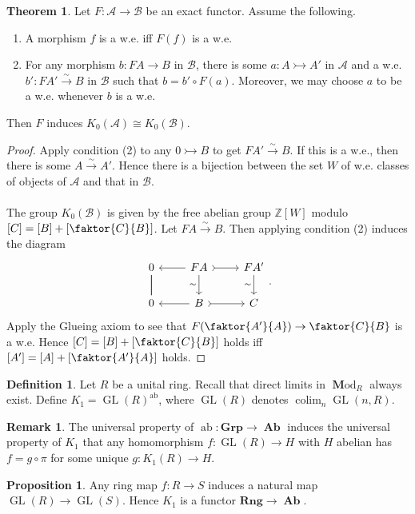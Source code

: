\documentclass[10pt,letterpaper,cm]{nupset}
\theoremstyle{definition}
\newtheorem*{definition}{Definition}
\newtheorem{remark}{Remark}
\newtheorem{theorem}{Theorem}
\newtheorem{prop}{Proposition}
\newcommand{\Z}{\mathbb Z}
\newcommand{\1}{\mathbf{1}}
\renewcommand{\a}{\mathscr{A}}
\renewcommand{\b}{\mathscr{B}}
\newcommand{\0}{\vec 0}
\DeclareMathOperator*{\GL}{GL}
\DeclareMathOperator{\ab}{ab}
\DeclareMathOperator{\colim}{colim}
\DeclareMathOperator{\Ab}{\mathbf{Ab}}
\DeclareMathOperator{\Mod}{\mathbf Mod}
\begin{document}
\begin{theorem}
Let $F : \a \to \b$ be an exact functor. Assume the following.
\begin{enumerate}
\item A morphism $f$ is a w.e. iff $F(f)$ is a w.e.
\item For any morphism $b : FA \to B$ in $\b$, there is some $a: A \rightarrowtail A'$ in $\a$ and a w.e. $b' : FA' \overset{\sim}{\longrightarrow} B$ in $\b$ such that $b = b' \circ F(a)$. Moreover, we may choose $a$ to be a w.e. whenever $b$ is a w.e.
\end{enumerate}
Then $F$ induces $K_0(\a) \cong K_0(\b)$.
\end{theorem}
\begin{proof}
Apply condition (2) to any $0 \rightarrowtail B$ to get $FA' \overset{\sim}{\longrightarrow} B$. If this is a w.e., then there is some $A \overset{\sim}{\longrightarrow} A'$. Hence there is a bijection between the set $W$ of w.e. classes of objects of $\a$ and that in $\b$. \\ \\ The group $K_0(\b)$ is given by the free abelian group $\Z[W]$ modulo $[C] = [B] + [\faktor{C}{B}]$. Let $FA \overset{\sim}{\longrightarrow}  B$. Then applying condition (2) induces the diagram
\[
\begin{tikzcd}
0 \arrow[d, no head] \arrow[d, no head] & FA \arrow[d, "\sim"'] \arrow[r, tail] \arrow[l] & FA' \arrow[d, "\sim"'] \\
0 & B \arrow[r, tail] \arrow[l] & C
\end{tikzcd}.
\]
Apply the Glueing axiom to see that $F(\faktor{A'}{A}) \to \faktor{C}{B}$ is a w.e. Hence $[C] = [B] + [\faktor{C}{B}]$
 holds iff $[A'] = [A] + [\faktor{A'}{A}]$ holds.
\end{proof}


\begin{definition}
Let $R$ be a unital ring. Recall that direct limits in $\Mod_R$ always exist. Define $K_1 = \GL(R)^{\ab}$, where $\GL(R)$ denotes $\colim_n \GL(n, R)$.
\end{definition}

\begin{remark}
The universal property of $\ab: \mathbf{Grp} \to \Ab$ induces the universal property of $K_1$ that any homomorphism $f: \GL(R) \to H$ with $H$ abelian has $f = g \circ \pi$ for some unique $g: K_1(R) \to H$.
\end{remark}

\begin{prop}
Any ring map $f: R \to S$ induces a natural map $\GL(R) \to \GL(S)$. Hence $K_1$ is a functor $\mathbf{Rng} \to \Ab$.
\end{prop}
\end{document}
